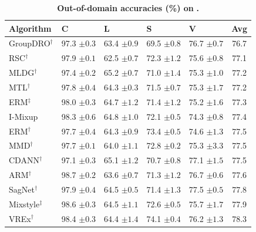 \begin{table}[H]
\centering
\small
\renewcommand{\arraystretch}{1.1}
\caption{\small\textbf{Out-of-domain accuracies (\%) on} \textbf{.}}
\begin{tabular}{lllll|c}
\toprule
\textbf{Algorithm} & \textbf{C} & \textbf{L} & \textbf{S} & \textbf{V} & \textbf{Avg} \\
\midrule
GroupDRO$^\dagger$ & 97.3 \scriptsize$\pm0.3$ & 63.4 \scriptsize$\pm0.9$ & 69.5 \scriptsize$\pm0.8$ & 76.7 \scriptsize$\pm0.7$ & 76.7 \\
RSC$^\dagger$ & 97.9 \scriptsize$\pm0.1$ & 62.5 \scriptsize$\pm0.7$ & 72.3 \scriptsize$\pm1.2$ & 75.6 \scriptsize$\pm0.8$ & 77.1 \\
MLDG$^\dagger$ & 97.4 \scriptsize$\pm0.2$ & 65.2 \scriptsize$\pm0.7$ & 71.0 \scriptsize$\pm1.4$ & 75.3 \scriptsize$\pm1.0$ & 77.2 \\
MTL$^\dagger$ & 97.8 \scriptsize$\pm0.4$ & 64.3 \scriptsize$\pm0.3$ & 71.5 \scriptsize$\pm0.7$ & 75.3 \scriptsize$\pm1.7$ & 77.2 \\
ERM$^\ddagger$ & 98.0 \scriptsize$\pm0.3$ & 64.7 \scriptsize$\pm1.2$ & 71.4 \scriptsize$\pm1.2$ & 75.2 \scriptsize$\pm1.6$ & 77.3 \\
I-Mixup & 98.3 \scriptsize$\pm0.6$ & 64.8 \scriptsize$\pm1.0$ & 72.1 \scriptsize$\pm0.5$ & 74.3 \scriptsize$\pm0.8$ & 77.4 \\
ERM$^\dagger$ & 97.7 \scriptsize$\pm0.4$ & 64.3 \scriptsize$\pm0.9$ & 73.4 \scriptsize$\pm0.5$ & 74.6 \scriptsize$\pm1.3$ & 77.5 \\
MMD$^\dagger$ & 97.7 \scriptsize$\pm0.1$ & 64.0 \scriptsize$\pm1.1$ & 72.8 \scriptsize$\pm0.2$ & 75.3 \scriptsize$\pm3.3$ & 77.5 \\
CDANN$^\dagger$ & 97.1 \scriptsize$\pm0.3$ & 65.1 \scriptsize$\pm1.2$ & 70.7 \scriptsize$\pm0.8$ & 77.1 \scriptsize$\pm1.5$ & 77.5 \\
ARM$^\dagger$ & 98.7 \scriptsize$\pm0.2$ & 63.6 \scriptsize$\pm0.7$ & 71.3 \scriptsize$\pm1.2$ & 76.7 \scriptsize$\pm0.6$ & 77.6 \\
SagNet$^\dagger$ & 97.9 \scriptsize$\pm0.4$ & 64.5 \scriptsize$\pm0.5$ & 71.4 \scriptsize$\pm1.3$ & 77.5 \scriptsize$\pm0.5$ & 77.8 \\
Mixstyle$^\ddagger$ & 98.6 \scriptsize$\pm0.3$ & 64.5 \scriptsize$\pm1.1$ & 72.6 \scriptsize$\pm0.5$ & 75.7 \scriptsize$\pm1.7$ & 77.9 \\
VREx$^\dagger$ & 98.4 \scriptsize$\pm0.3$ & 64.4 \scriptsize$\pm1.4$ & 74.1 \scriptsize$\pm0.4$ & 76.2 \scriptsize$\pm1.3$ & 78.3 \\

\end{tabular}
\end{table}
